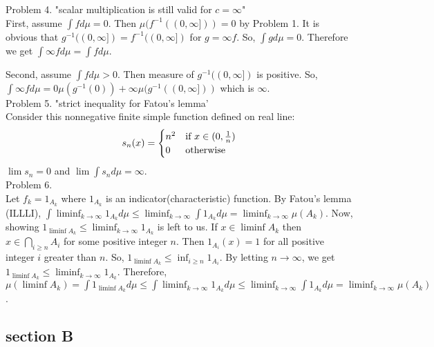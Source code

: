 Problem 4. "scalar multiplication is still valid for $c = \infty$" \\

First, assume $\int f d\mu = 0$. Then $\mu(f^{-1}((0, \infty])) = 0$ by Problem 1.
It is obvious that $g^{-1}((0, \infty]) = f^{-1}((0, \infty])$ for $g = \infty f$.
So, $\int g d\mu = 0$. Therefore we get $\int \infty f d\mu = \int f d\mu$.

Second, assume $\int f d\mu > 0$. Then measure of $g ^ {-1} ((0, \infty ])$ is positive.
So, $\int \infty f d \mu = 0 \mu ( g ^ {-1} (0)) + \infty \mu(g^{-1}((0, \infty]))$ which is $\infty$.\\

Problem 5. "strict inequality for Fatou's lemma'\\

Consider this nonnegative finite simple function defined on real line:
\begin{equation*}
    s_n(x) = \begin{cases}
        n^2 & \text{if } x \in (0, {1 \over n}) \\
        0 & \text{otherwise}
    \end{cases}
\end{equation*}
$\lim s_n = 0$ and $\lim \int s_n d\mu = \infty$.\\

Problem 6.\\

Let $f_k = 1_{A_k}$ where $1_{A_k}$ is an indicator(characteristic) function.
By Fatou's lemma (ILLLI), $\int \liminf_{k \rightarrow \infty} 1_{A_k} d\mu \leq \liminf_{k \rightarrow \infty} \int 1_{A_k}d\mu = \liminf_{k \rightarrow \infty} \mu(A_k)$.
Now, showing $1_{\liminf A_k} \leq \liminf_{k\rightarrow \infty}1_{A_k}$ is left to us.
If $x \in \liminf A_k$ then $x \in \bigcap_{i\geq n} A_i$ for some positive integer $n$.
Then $1_{A_i}(x) = 1$ for all positive integer $i$ greater than $n$. So, $1_{\liminf A_k} \leq \inf_{i\geq n} 1_{A_i}$.
By letting $n \rightarrow \infty$, we get $1_{\liminf A_k} \leq \liminf_{k\rightarrow \infty}1_{A_k}$.
Therefore, $\mu(\liminf A_k) = \int 1_{\liminf A_k}d\mu \leq \int \liminf_{k \rightarrow \infty} 1_{A_k} d\mu \leq \liminf_{k \rightarrow \infty} \int 1_{A_k}d\mu = \liminf_{k \rightarrow \infty} \mu(A_k)$.\\

\subsection*{section B}\hfill \\

